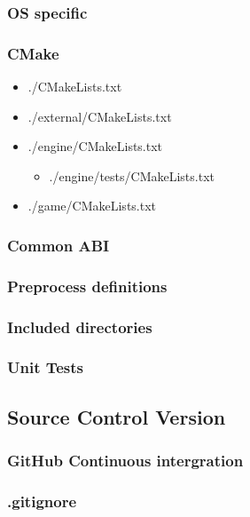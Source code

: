 \newpage
\subsubsection{OS specific}
\label{sec:build_os}

\newpage
\subsubsection{CMake}
\begin{itemize}
    \item ./CMakeLists.txt
    \item ./external/CMakeLists.txt
    \item ./engine/CMakeLists.txt
        \begin{itemize}
            \item ./engine/tests/CMakeLists.txt
        \end{itemize}
    \item ./game/CMakeLists.txt
\end{itemize}

\newpage

\label{sec:abi}
\subsubsection{Common ABI}

\subsubsection{Preprocess definitions}

\subsubsection{Included directories}

\subsubsection{Unit Tests}
\label{sec:build_unit_tests}

\subsection{Source Control Version}
\subsubsection{GitHub Continuous intergration}
\subsubsection{.gitignore}